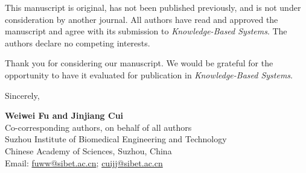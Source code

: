 \documentclass[11pt]{article}
\begin{document}
This manuscript is original, has not been published previously, and is not
under consideration by another journal. All authors have read and approved the
manuscript and agree with its submission to \textit{Knowledge-Based Systems}.
The authors declare no competing interests.

Thank you for considering our manuscript. We would be grateful for the
opportunity to have it evaluated for publication in
\textit{Knowledge-Based Systems}.

Sincerely,

\textbf{Weiwei Fu and Jinjiang Cui}\\
Co-corresponding authors, on behalf of all authors\\
Suzhou Institute of Biomedical Engineering and Technology\\
Chinese Academy of Sciences, Suzhou, China\\
Email: \href{mailto:fuww@sibet.ac.cn}{fuww@sibet.ac.cn};
\href{mailto:cuijj@sibet.ac.cn}{cuijj@sibet.ac.cn}
\end{document}

